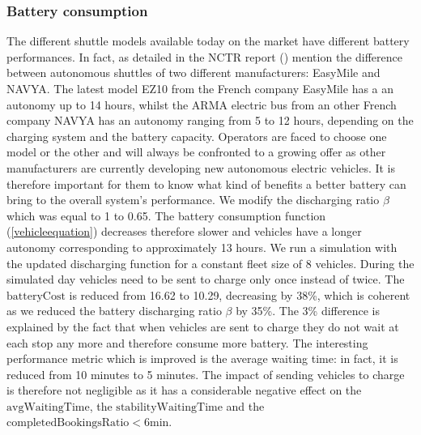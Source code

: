 \documentclass[12pt,a4paper]{article}
\begin{document}
\subsubsection{Battery consumption}\label{batterycons}
The different shuttle models available today on the market have different battery performances. In fact, as detailed in the NCTR report (\cite{nctr}) mention the difference between autonomous shuttles of two different manufacturers: EasyMile and NAVYA. The latest model EZ10 from the French company EasyMile has a an autonomy up to 14 hours, whilst the ARMA electric bus from an other French company NAVYA has an autonomy ranging from 5 to 12 hours, depending on the charging system and the battery capacity. Operators are faced to choose one model or the other and will always be confronted to a growing offer as other manufacturers are currently developing new autonomous electric vehicles. It is therefore important for them to know what kind of benefits a better battery can bring to the overall system's performance. We modify the discharging ratio $\beta$ which was equal to 1 to 0.65. The battery consumption function (\ref{vehicleequation}) decreases therefore slower and vehicles have a longer autonomy corresponding to approximately 13 hours. We run a simulation with the updated discharging function for a constant fleet size of 8 vehicles. During the simulated day vehicles need to be sent to charge only once instead of twice. The $\text{batteryCost}$ is reduced from 16.62 to 10.29, decreasing by 38\%, which is coherent as we reduced the battery discharging ratio $\beta$ by 35\%. The 3\% difference is explained by the fact that when vehicles are sent to charge they do not wait at each stop any more and therefore consume more battery. The interesting performance metric which is improved is the average waiting time: in fact, it is reduced from 10 minutes to 5 minutes. The impact of sending vehicles to charge is therefore not negligible as it has a considerable negative effect on the $\text{avgWaitingTime}$, the $\text{stabilityWaitingTime}$ and the $\text{completedBookingsRatio} < 6\text{min}$. 
\end{document}
